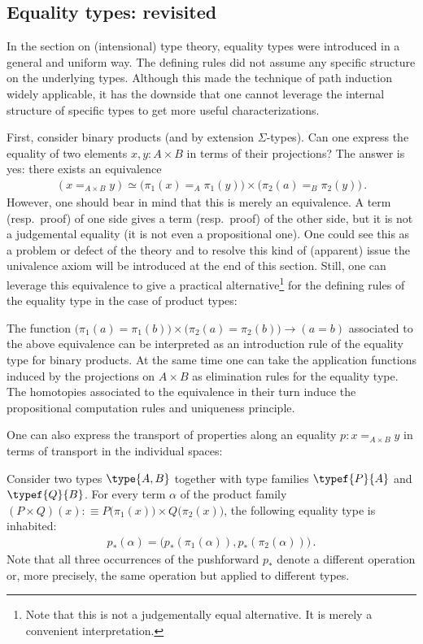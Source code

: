 \subsection{Equality types: revisited}

    In the section on (intensional) type theory, equality types were introduced in a general and uniform way. The defining rules did not assume any specific structure on the underlying types. Although this made the technique of path induction widely applicable, it has the downside that one cannot leverage the internal structure of specific types to get more useful characterizations.

    First, consider binary products (and by extension $\Sigma$-types). Can one express the equality of two elements $x,y:A\times B$ in terms of their projections? The answer is yes: there exists an equivalence
    \begin{gather}
        (x=_{A\times B}y)\simeq\bigl(\pi_1(x)=_A\pi_1(y)\bigr)\times\bigl(\pi_2(a)=_B\pi_2(y)\bigr)\,.
    \end{gather}
    However, one should bear in mind that this is merely an equivalence. A term (resp.~proof) of one side gives a term (resp.~proof) of the other side, but it is not a judgemental equality (it is not even a propositional one). One could see this as a problem or defect of the theory and to resolve this kind of (apparent) issue the univalence axiom will be introduced at the end of this section. Still, one can leverage this equivalence to give a practical alternative\footnote{Note that this is not a judgementally equal alternative. It is merely a convenient interpretation.} for the defining rules of the equality type in the case of product types:
    \begin{remark}
        The function $\bigl(\pi_1(a)=\pi_1(b)\bigr)\times\bigl(\pi_2(a)=\pi_2(b)\bigr)\rightarrow(a=b)$ associated to the above equivalence can be interpreted as an introduction rule of the equality type for binary products. At the same time one can take the application functions induced by the projections on $A\times B$ as elimination rules for the equality type. The homotopies associated to the equivalence in their turn induce the propositional computation rules and uniqueness principle.
    \end{remark}

    One can also express the transport of properties along an equality $p:x=_{A\times B}y$ in terms of transport in the individual spaces:
    \begin{property}
        Consider two types $\type{A, B}$ together with type families $\typef{P}{A}$ and $\typef{Q}{B}$. For every term $\alpha$ of the product family $(P\times Q)(x):\equiv P\bigl(\pi_1(x)\bigr)\times Q\bigl(\pi_2(x)\bigr)$, the following equality type is inhabited:
        \begin{gather}
            p_*(\alpha) = \bigl(p_*(\pi_1(\alpha)), p_*(\pi_2(\alpha))\bigr)\,.
        \end{gather}
        Note that all three occurrences of the pushforward $p_*$ denote a different operation or, more precisely, the same operation but applied to different types.
    \end{property}

